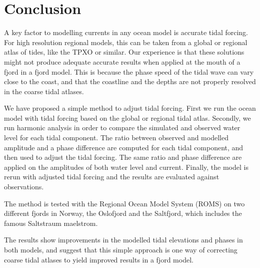 \section{Conclusion}

A key factor to modelling currents in any ocean model is accurate tidal forcing. For high resolution regional models, this can be taken from a global or regional atlas of tides, like the TPXO or similar. Our experience is that these solutions might not produce adequate accurate results when applied at the mouth of a fjord in a fjord model. This is because the phase speed of the tidal wave can vary close to the coast, and that the coastline and the depths are not properly resolved in the coarse tidal atlases.

We have proposed a simple method to adjust tidal forcing. First we run the ocean model with tidal forcing based on the global or regional tidal atlas. Secondly, we run harmonic analysis in order to compare the simulated and observed water level for each tidal component. The ratio between observed and modelled amplitude and a phase difference are computed for each tidal component, and then used to adjust the tidal forcing. The same ratio and phase difference are applied on the amplitudes of both water level and current. Finally, the model is rerun with adjusted tidal forcing and the results are evaluated against observations.

The method is tested with the Regional Ocean Model System (ROMS) on two different fjords in Norway, the Oslofjord and the Saltfjord, which includes the famous Saltstraum maelstrom.
 
The results show improvements in the modelled tidal elevations and phases in both models, and suggest that this simple approach is one way of correcting coarse tidal atlases to yield improved results in a fjord model.
